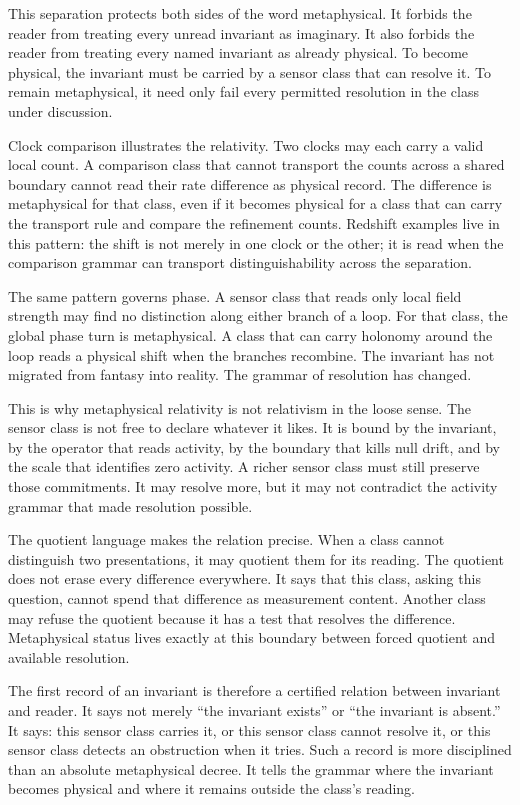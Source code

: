 This separation protects both sides of the word metaphysical. It forbids
the reader from treating every unread invariant as imaginary. It also
forbids the reader from treating every named invariant as already physical.
To become physical, the invariant must be carried by a sensor class that
can resolve it. To remain metaphysical, it need only fail every permitted
resolution in the class under discussion.

Clock comparison illustrates the relativity. Two clocks may each carry a
valid local count. A comparison class that cannot transport the counts
across a shared boundary cannot read their rate difference as physical
record. The difference is metaphysical for that class, even if it becomes
physical for a class that can carry the transport rule and compare the
refinement counts. Redshift examples live in this pattern: the shift is not
merely in one clock or the other; it is read when the comparison grammar can
transport distinguishability across the separation.

The same pattern governs phase. A sensor class that reads only local field
strength may find no distinction along either branch of a loop. For that
class, the global phase turn is metaphysical. A class that can carry
holonomy around the loop reads a physical shift when the branches recombine.
The invariant has not migrated from fantasy into reality. The grammar of
resolution has changed.

This is why metaphysical relativity is not relativism in the loose sense.
The sensor class is not free to declare whatever it likes. It is bound by
the invariant, by the operator that reads activity, by the boundary that
kills null drift, and by the scale that identifies zero activity. A richer
sensor class must still preserve those commitments. It may resolve more,
but it may not contradict the activity grammar that made resolution
possible.

The quotient language makes the relation precise. When a class cannot
distinguish two presentations, it may quotient them for its reading. The
quotient does not erase every difference everywhere. It says that this
class, asking this question, cannot spend that difference as measurement
content. Another class may refuse the quotient because it has a test that
resolves the difference. Metaphysical status lives exactly at this boundary
between forced quotient and available resolution.

The first record of an invariant is therefore a certified relation between
invariant and reader. It says not merely ``the invariant exists'' or ``the
invariant is absent.'' It says: this sensor class carries it, or this sensor
class cannot resolve it, or this sensor class detects an obstruction when it
tries. Such a record is more disciplined than an absolute metaphysical
decree. It tells the grammar where the invariant becomes physical and where
it remains outside the class's reading.

